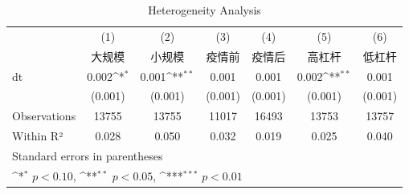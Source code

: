 \begin{table}[htbp]\centering
\def\sym#1{\ifmmode^{#1}\else\(^{#1}\)\fi}
\caption{Heterogeneity Analysis}
\begin{tabular}{l*{6}{c}}
\hline\hline
            &\multicolumn{1}{c}{(1)}&\multicolumn{1}{c}{(2)}&\multicolumn{1}{c}{(3)}&\multicolumn{1}{c}{(4)}&\multicolumn{1}{c}{(5)}&\multicolumn{1}{c}{(6)}\\
            &\multicolumn{1}{c}{大规模}&\multicolumn{1}{c}{小规模}&\multicolumn{1}{c}{疫情前}&\multicolumn{1}{c}{疫情后}&\multicolumn{1}{c}{高杠杆}&\multicolumn{1}{c}{低杠杆}\\
\hline
dt          &       0.002\sym{*}  &       0.001\sym{**} &       0.001         &       0.001         &       0.002\sym{**} &       0.001         \\
            &     (0.001)         &     (0.001)         &     (0.001)         &     (0.001)         &     (0.001)         &     (0.001)         \\
\hline
Observations&       13755         &       13755         &       11017         &       16493         &       13753         &       13757         \\
Within R²   &       0.028         &       0.050         &       0.032         &       0.019         &       0.025         &       0.040         \\
\hline\hline
\multicolumn{7}{l}{\footnotesize Standard errors in parentheses}\\
\multicolumn{7}{l}{\footnotesize \sym{*} \(p<0.10\), \sym{**} \(p<0.05\), \sym{***} \(p<0.01\)}\\
\end{tabular}
\end{table}
